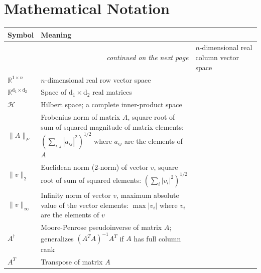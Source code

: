 

\section*{Mathematical Notation}
\begin{longtable}{p{1.7cm} p{11.6cm}}
    \label{tab:Operators}\\
    Symbol & Meaning \\
    \toprule
    \endfirsthead
    \toprule
    \endhead
    \bottomrule \multicolumn{2}{r}{\emph{continued on the next page}}
    \endfoot
    \bottomrule
    \endlastfoot
    $\mathbb{R}^{n \times 1}$ & $n$-dimensional real column vector space \\
    $\mathbb{R}^{1 \times n}$ & $n$-dimensional real row vector space \\
    $\mathbb{R}^{\mathrm{d_1}\times \mathrm{d_2}}$ & Space of $\mathrm{d_1} \times \mathrm{d_2}$ real matrices \\
    $\mathcal{H}$ & Hilbert space; a complete inner-product space \\
    $\|A\|_F$ & Frobenius norm of matrix $A$, square root of sum of squared magnitude of matrix elements: $\left( \sum_{i,j} |a_{ij}|^2 \right)^{1/2}$ where $a_{ij}$ are the elements of $A$\\
    $\|v\|_2$ & Euclidean norm (2-norm) of vector $v$, square root of sum of squared elements: $\left( \sum_{i} |v_{i}|^2 \right)^{1/2}$ \\
    $\| v\|_{\infty} $ & Infinity norm of vector $v$, maximum absolute value of the vector elements: $\max |v_{i}|$ where $v_{i}$ are the elements of $v$\\
    $A^{\dagger}$ & Moore-Penrose pseudoinverse of matrix $A$; generalizes $(A^{T}A)^{-1}A^{T}$ if $A$ has full column rank \\
    $A^T$ & Transpose of matrix $A$ \\[4pt]
\end{longtable}

